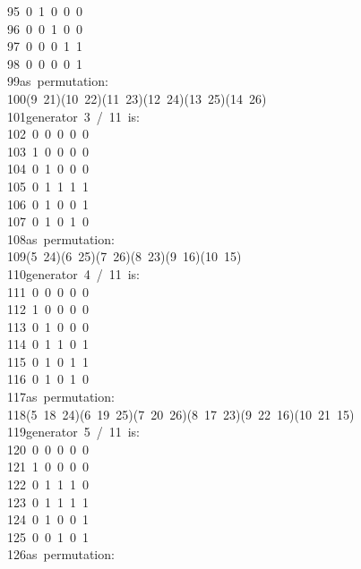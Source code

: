 \begin{tabbing}
95\ 0\ 1\ 0\ 0\ 0\ \\[0pt]
96\ 0\ 0\ 1\ 0\ 0\ \\[0pt]
97\ 0\ 0\ 0\ 1\ 1\ \\[0pt]
98\ 0\ 0\ 0\ 0\ 1\ \\[0pt]
99\>as\ permutation:\ \\[0pt]
100\>(9\ 21)(10\ 22)(11\ 23)(12\ 24)(13\ 25)(14\ 26)\\[0pt]
101\>generator\ 3\ /\ 11\ is:\ \\[0pt]
102\ 0\ 0\ 0\ 0\ 0\ \\[0pt]
103\ 1\ 0\ 0\ 0\ 0\ \\[0pt]
104\ 0\ 1\ 0\ 0\ 0\ \\[0pt]
105\ 0\ 1\ 1\ 1\ 1\ \\[0pt]
106\ 0\ 1\ 0\ 0\ 1\ \\[0pt]
107\ 0\ 1\ 0\ 1\ 0\ \\[0pt]
108\>as\ permutation:\ \\[0pt]
109\>(5\ 24)(6\ 25)(7\ 26)(8\ 23)(9\ 16)(10\ 15)\\[0pt]
110\>generator\ 4\ /\ 11\ is:\ \\[0pt]
111\ 0\ 0\ 0\ 0\ 0\ \\[0pt]
112\ 1\ 0\ 0\ 0\ 0\ \\[0pt]
113\ 0\ 1\ 0\ 0\ 0\ \\[0pt]
114\ 0\ 1\ 1\ 0\ 1\ \\[0pt]
115\ 0\ 1\ 0\ 1\ 1\ \\[0pt]
116\ 0\ 1\ 0\ 1\ 0\ \\[0pt]
117\>as\ permutation:\ \\[0pt]
118\>(5\ 18\ 24)(6\ 19\ 25)(7\ 20\ 26)(8\ 17\ 23)(9\ 22\ 16)(10\ 21\ 15)\\[0pt]
119\>generator\ 5\ /\ 11\ is:\ \\[0pt]
120\ 0\ 0\ 0\ 0\ 0\ \\[0pt]
121\ 1\ 0\ 0\ 0\ 0\ \\[0pt]
122\ 0\ 1\ 1\ 1\ 0\ \\[0pt]
123\ 0\ 1\ 1\ 1\ 1\ \\[0pt]
124\ 0\ 1\ 0\ 0\ 1\ \\[0pt]
125\ 0\ 0\ 1\ 0\ 1\ \\[0pt]
126\>as\ permutation:\ \\[0pt]

\end{tabbing}
